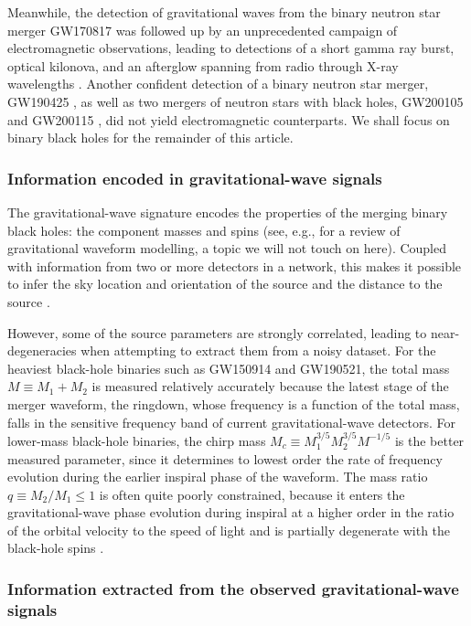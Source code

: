 \documentclass[review]{elsarticle}
\begin{document}
Meanwhile, the detection of gravitational waves from the binary neutron star merger GW170817 \citep{GW170817} was followed up by an unprecedented campaign of electromagnetic observations, leading to detections of a short gamma ray burst, optical kilonova, and an afterglow spanning from radio through X-ray wavelengths \citep{GW170817:GRB,GW170817:MMA}.  Another confident detection of a binary neutron star merger, GW190425 \citep{GW190425}, as well as two mergers of neutron stars with black holes,  GW200105 and GW200115 \citep{GW200105}, did not yield electromagnetic counterparts.  
We shall focus on binary black holes for the remainder of this article.

\subsubsection{Information encoded in gravitational-wave signals}
The gravitational-wave signature encodes the properties of the merging binary black holes: the component masses and spins (see, e.g., \cite{Schmidt:2020} for a review of gravitational waveform modelling, a topic we will not touch on here). Coupled with information from two or more detectors in a network, this makes it possible to infer the sky location and orientation of the source and the distance to the source \citep{Veitch:2014,GW150914:PE, Ashton:2019}.  

However, some of the source parameters are strongly correlated, leading to near-degeneracies when attempting to extract them from a noisy dataset.   For the heaviest black-hole binaries such as GW150914 and GW190521, the total mass $M \equiv M_1 + M_2$ is measured relatively accurately because the latest stage of the merger waveform, the ringdown, whose frequency is a function of the total mass, falls in the sensitive frequency band of current gravitational-wave detectors.  For lower-mass black-hole binaries, the chirp mass $M_c \equiv M_1^{3/5} M_2^{3/5} M^{-1/5}$ is the better measured parameter, since it determines to lowest order the rate of frequency evolution during the earlier inspiral phase of the waveform.  The mass ratio $q\equiv M_2/M_1 \leq 1$ is often quite poorly constrained, because it enters the gravitational-wave phase evolution during inspiral at a higher order in the ratio of the orbital velocity to the speed of light and is partially degenerate with the black-hole spins \citep[e.g.,][]{PoissonWill:1995,Hannam:2013}.  

\subsubsection{Information extracted from the observed gravitational-wave signals}\label{sec:GWevents}
\end{document}
